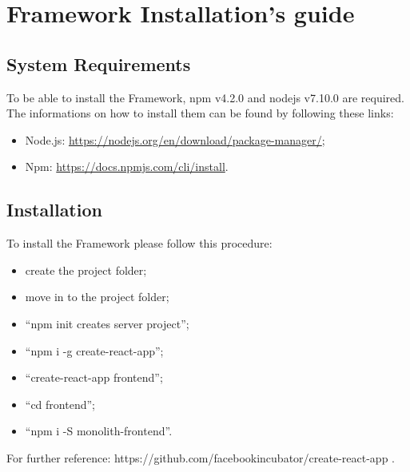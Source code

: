 \section{Framework Installation's guide}

\subsection{System Requirements}
To be able to install the Framework, npm v4.2.0 and nodejs v7.10.0 are required. The informations on how to install them can be found by following these links:
\begin{itemize}
	\item Node.js: \url{https://nodejs.org/en/download/package-manager/};
	\item Npm: \url{https://docs.npmjs.com/cli/install}.
\end{itemize}

\subsection{Installation}

To install the Framework  please follow this procedure:
\begin{itemize}
    \item create the project folder;
    \item move in to the project folder;
    \item ``npm init creates server project'';
    \item ``npm i -g create-react-app'';
    \item ``create-react-app frontend'';
    \item ``cd frontend'';
    \item ``npm i -S monolith-frontend''. 
\end{itemize}

For further reference: https://github.com/facebookincubator/create-react-app .
